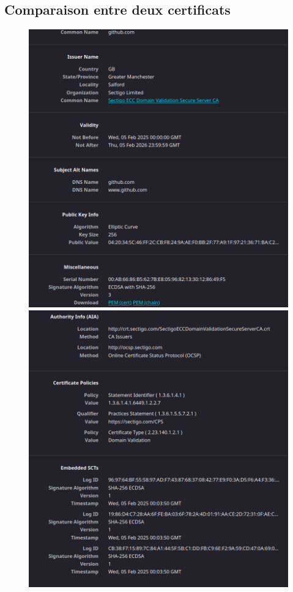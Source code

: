 \documentclass[12pt,a4paper]{article}
\begin{document}
	\subsection{Comparaison entre deux certificats}

\begin{figure}[!h]
    \centering
    \begin{minipage}{0.3\textwidth}
        \centering
        \includegraphics[scale=0.22]{github_1.png}
    \end{minipage}
    \begin{minipage}{0.3\textwidth}
        \centering
        \includegraphics[scale=0.22]{github_3.png}

\end{minipage}
\end{figure}
\end{document}
